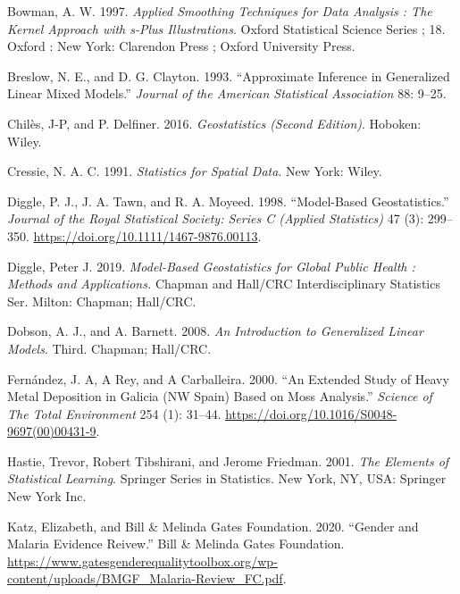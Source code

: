 \documentclass[
  letterpaper,
]{krantz}
\newlength{\cslhangindent}
\newlength{\cslentryspacingunit} %
\newenvironment{CSLReferences}[2] %
 {%
  \setlength{\parindent}{0pt}
  \ifodd #1
  \let\oldpar\par
  \def\par{\hangindent=\cslhangindent\oldpar}
  \fi
  \setlength{\parskip}{#2\cslentryspacingunit}
 }%
 {}
\begin{document}
\hypertarget{refs}{}
\begin{CSLReferences}{1}{0}
\leavevmode{}%
Bowman, A. W. 1997. \emph{Applied Smoothing Techniques for Data Analysis
: The Kernel Approach with s-Plus Illustrations}. Oxford Statistical
Science Series ; 18. Oxford : New York: Clarendon Press ; Oxford
University Press.

\leavevmode{}%
Breslow, N. E., and D. G. Clayton. 1993. {``Approximate Inference in
Generalized Linear Mixed Models.''} \emph{Journal of the American
Statistical Association} 88: 9--25.

\leavevmode{}%
Chilès, J-P, and P. Delfiner. 2016. \emph{Geostatistics (Second
Edition)}. Hoboken: Wiley.

\leavevmode{}%
Cressie, N. A. C. 1991. \emph{Statistics for Spatial Data}. New York:
Wiley.

\leavevmode{}%
Diggle, P. J., J. A. Tawn, and R. A. Moyeed. 1998. {``Model-Based
Geostatistics.''} \emph{Journal of the Royal Statistical Society: Series
C (Applied Statistics)} 47 (3): 299--350.
\url{https://doi.org/10.1111/1467-9876.00113}.

\leavevmode{}%
Diggle, Peter J. 2019. \emph{Model-Based Geostatistics for Global Public
Health : Methods and Applications.} Chapman and Hall/CRC
Interdisciplinary Statistics Ser. Milton: Chapman; Hall/CRC.

\leavevmode{}%
Dobson, A. J., and A. Barnett. 2008. \emph{An Introduction to
Generalized Linear Models}. Third. Chapman; Hall/CRC.

\leavevmode{}%
Fernández, J. A, A Rey, and A Carballeira. 2000. {``An Extended Study of
Heavy Metal Deposition in Galicia (NW Spain) Based on Moss Analysis.''}
\emph{Science of The Total Environment} 254 (1): 31--44.
\url{https://doi.org/10.1016/S0048-9697(00)00431-9}.

\leavevmode{}%
Hastie, Trevor, Robert Tibshirani, and Jerome Friedman. 2001. \emph{The
Elements of Statistical Learning}. Springer Series in Statistics. New
York, NY, USA: Springer New York Inc.

\leavevmode{}%
Katz, Elizabeth, and Bill \& Melinda Gates Foundation. 2020. {``Gender
and Malaria Evidence Reivew.''} Bill \& Melinda Gates Foundation.
\url{https://www.gatesgenderequalitytoolbox.org/wp-content/uploads/BMGF_Malaria-Review_FC.pdf}.


\end{CSLReferences}
\end{document}

